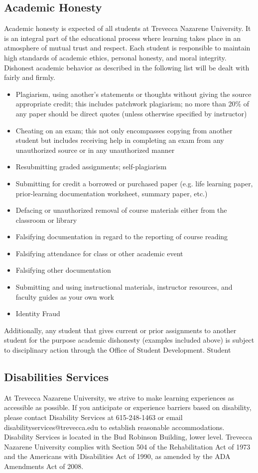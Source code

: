 \documentclass[11pt]{article}
\begin{document}
\subsection*{Academic Honesty}
Academic honesty is expected of all students at Trevecca Nazarene University. It is an integral part of the educational process where learning takes place in an atmosphere of mutual trust and respect. Each student is responsible to maintain high standards of academic ethics, personal honesty, and moral integrity. Dishonest academic behavior as described in the following list will be dealt with fairly and firmly.
\begin{itemize}
	\item Plagiarism, using another's statements or thoughts without giving the source appropriate credit; this includes patchwork plagiarism; no more than 20\% of any paper should be direct quotes (unless otherwise specified by instructor)
	\item Cheating on an exam; this not only encompasses copying from another student but includes receiving help in completing an exam from any unauthorized source or in any unauthorized manner
	\item Resubmitting graded assignments; self-plagiarism
	\item Submitting for credit a borrowed or purchased paper (e.g. life learning paper, prior-learning documentation worksheet, summary paper, etc.)
	\item Defacing or unauthorized removal of course materials either from the classroom or library
	\item Falsifying documentation in regard to the reporting of course reading
	\item Falsifying attendance for class or other academic event
	\item Falsifying other documentation
	\item Submitting and using instructional materials, instructor resources, and faculty guides as your own work
	\item Identity Fraud
\end{itemize}
Additionally, any student that gives current or prior assignments to another student for the purpose academic dishonesty (examples included above) is subject to disciplinary action through the Office of Student Development. Student

\subsection*{Disabilities Services}
At Trevecca Nazarene University, we strive to make learning experiences as accessible as possible. If you anticipate or experience barriers based on disability, please contact Disability Services at 615-248-1463 or email disabilityservices@trevecca.edu to establish reasonable accommodations. Disability Services is located in the Bud Robinson Building, lower level. Trevecca Nazarene University complies with Section 504 of the Rehabilitation Act of 1973 and the Americans with Disabilities Act of 1990, as amended by the ADA Amendments Act of 2008.
\end{document}
